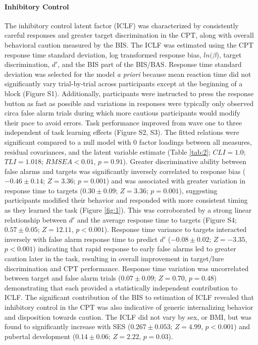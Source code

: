 \documentclass{article}%
\begin{document}
\paragraph*{Inhibitory Control} 
The inhibitory control latent factor (ICLF) was characterized by consistently careful responses and greater target discrimination in the CPT, along with overall behavioral caution measured by the BIS. The ICLF  was estimated using the CPT response time standard deviation, log transformed response bias, $ln(\beta$), target discrimination, $d'$, and the BIS part of the BIS/BAS. Response time standard deviation was selected for the model \textit{a priori} because mean reaction time did not significantly vary trial-by-trial across participants except at the beginning of a block (Figure S1). Additionally, participants were instructed to press the response button as fast as possible and variations in responses were typically only observed circa false alarm trials during which more cautious participants would modify their pace to avoid errors. Task performance improved from wave one to three independent of task learning effects (Figure S2, S3). The fitted relations were significant compared to a null model with 0 factor loadings between all measures, residual covariances, and the latent variable estimate (Table \ref{tab:2}; $CLI = 1.0$; $TLI = 1.018$; $RMSEA < 0.01$, $p = 0.91$). Greater discriminative ability between false alarms and targets was significantly inversely correlated to response bias ($-0.46\pm0.14$; $Z=3.36$; $p=0.001$) and was associated with greater variation in response time to targets ($0.30\pm0.09$; $Z=3.36$; $p=0.001$), suggesting participants modified their behavior and responded with more consistent timing as they learned the task (Figure \ref{fig:1}). This was corroborated by a strong linear relationship between $d'$ and the average response time to targets (Figure S4; $0.57\pm0.05$; $Z=12.11$, $p<0.001$). Response time variance to targets interacted inversely with false alarm response time to predict $d'$ ($-0.08\pm0.02$;  $Z=-3.35$, $p < 0.001$) indicating that rapid response to early false alarms led to greater caution later in the task, resulting in overall improvement in target/lure discrimination and CPT performance. Response time variation was uncorrelated between target and false alarm trials ($0.07\pm0.09$; $Z=0.70$, $p=0.48$) demonstrating that each provided a statistically independent contribution to ICLF. The significant contribution of the BIS to estimation of ICLF revealed that inhibitory control in the CPT was also indicative of generic internalizing behavior and disposition towards caution. The ICLF did not vary by sex, or BMI, but was found to significantly increase with SES ($0.267\pm0.053$; $Z=4.99$, $p<0.001$) and pubertal development ($0.14\pm0.06$; $Z=2.22$, $p=0.03$). 
\end{document}
